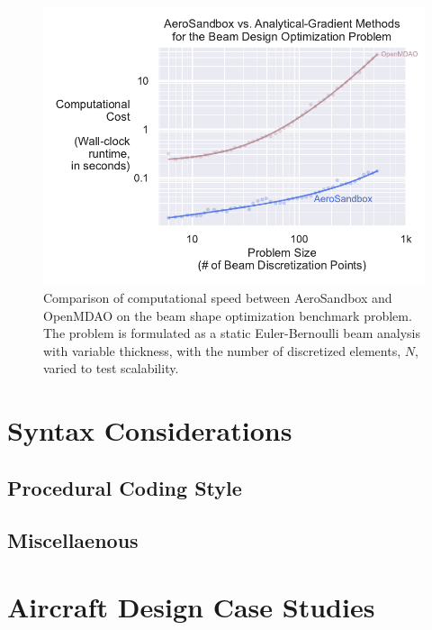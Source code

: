 \begin{figure}[h]
    \centering
    \includegraphics[width=\textwidth]{../figures/benchmark_om_beam.pdf}
    \caption{Comparison of computational speed between AeroSandbox and OpenMDAO on the beam shape optimization benchmark problem. The problem is formulated as a static Euler-Bernoulli beam analysis with variable thickness, with the number of discretized elements, $N$, varied to test scalability.}
    \label{fig:benchmark_om_beam}
\end{figure}





\section{Syntax Considerations}

\subsection{Procedural Coding Style}

\subsection{Miscellaenous} %

\section{Aircraft Design Case Studies}

